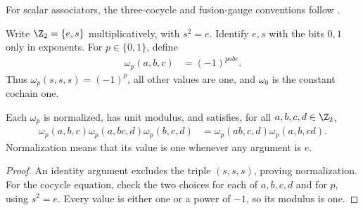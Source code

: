 For scalar associators, the three-cocycle and fusion-gauge conventions follow
\cite{GarreRubioSchuch2024DomainWall}.

\begin{definition}
    \label{def:asymex_z2_cocycles}
    \leanok
    Write $\Z_2=\{e,s\}$ multiplicatively, with $s^2=e$.
    Identify $e,s$ with the bits $0,1$ only in exponents.
    For $p\in\{0,1\}$, define
    \begin{align}
        \omega_p(a,b,c) & =(-1)^{pabc}.
    \end{align}
    Thus $\omega_p(s,s,s)=(-1)^p$, all other values are one,
    and $\omega_0$ is the constant cochain one.
\end{definition}

\begin{theorem}
    \label{thm:asymex_z2_properties}
    \leanok
    Each $\omega_p$ is normalized, has unit modulus, and satisfies,
    for all $a,b,c,d\in\Z_2$,
    \begin{align}
        \omega_p(a,b,c)\omega_p(a,bc,d)\omega_p(b,c,d)
         & =\omega_p(ab,c,d)\omega_p(a,b,cd).
    \end{align}
    Normalization means that its value is one whenever any argument is $e$.
\end{theorem}
\begin{proof}
    \leanok
    An identity argument excludes the triple $(s,s,s)$, proving
    normalization. For the cocycle equation, check the two choices
    for each of $a,b,c,d$ and for $p$, using $s^2=e$.
    Every value is either one or a power of $-1$, so its modulus is one.
\end{proof}

